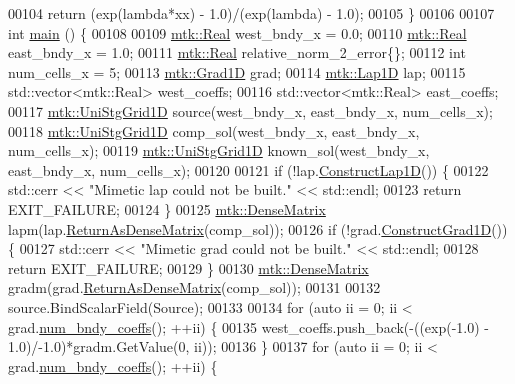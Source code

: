 \begin{DoxyCode}
00104   \textcolor{keywordflow}{return} (exp(lambda*xx) - 1.0)/(exp(lambda) - 1.0);
00105 \}
00106 
00107 \textcolor{keywordtype}{int} \hyperlink{minimalistic__poisson__1d_8cc_ae66f6b31b5ad750f1fe042a706a4e3d4}{main} () \{
00108 
00109   \hyperlink{group__c01-roots_gac080bbbf5cbb5502c9f00405f894857d}{mtk::Real} west\_bndy\_x = 0.0;
00110   \hyperlink{group__c01-roots_gac080bbbf5cbb5502c9f00405f894857d}{mtk::Real} east\_bndy\_x = 1.0;
00111   \hyperlink{group__c01-roots_gac080bbbf5cbb5502c9f00405f894857d}{mtk::Real} relative\_norm\_2\_error\{\};
00112   \textcolor{keywordtype}{int} num\_cells\_x = 5;
00113   \hyperlink{classmtk_1_1Grad1D}{mtk::Grad1D} grad;
00114   \hyperlink{classmtk_1_1Lap1D}{mtk::Lap1D} lap;
00115   std::vector<mtk::Real> west\_coeffs;
00116   std::vector<mtk::Real> east\_coeffs;
00117   \hyperlink{classmtk_1_1UniStgGrid1D}{mtk::UniStgGrid1D} source(west\_bndy\_x, east\_bndy\_x, num\_cells\_x);
00118   \hyperlink{classmtk_1_1UniStgGrid1D}{mtk::UniStgGrid1D} comp\_sol(west\_bndy\_x, east\_bndy\_x, num\_cells\_x);
00119   \hyperlink{classmtk_1_1UniStgGrid1D}{mtk::UniStgGrid1D} known\_sol(west\_bndy\_x, east\_bndy\_x, num\_cells\_x);
00120 
00121   \textcolor{keywordflow}{if} (!lap.\hyperlink{classmtk_1_1Lap1D_a685dcba88c08cf5b7b6c2aa4669a472c}{ConstructLap1D}()) \{
00122     std::cerr << \textcolor{stringliteral}{"Mimetic lap could not be built."} << std::endl;
00123     \textcolor{keywordflow}{return} EXIT\_FAILURE;
00124   \}
00125   \hyperlink{classmtk_1_1DenseMatrix}{mtk::DenseMatrix} lapm(lap.\hyperlink{classmtk_1_1Lap1D_a28672c735fa0d13e6204795b63aec4e2}{ReturnAsDenseMatrix}(comp\_sol));
00126   \textcolor{keywordflow}{if} (!grad.\hyperlink{classmtk_1_1Grad1D_a74ef5245cfae6fd158bd7f563a0c2e52}{ConstructGrad1D}()) \{
00127     std::cerr << \textcolor{stringliteral}{"Mimetic grad could not be built."} << std::endl;
00128     \textcolor{keywordflow}{return} EXIT\_FAILURE;
00129   \}
00130   \hyperlink{classmtk_1_1DenseMatrix}{mtk::DenseMatrix} gradm(grad.\hyperlink{classmtk_1_1Grad1D_a4218516bfb43f683559322ea97058c78}{ReturnAsDenseMatrix}(comp\_sol));
00131 
00132   source.BindScalarField(Source);
00133 
00134   \textcolor{keywordflow}{for} (\textcolor{keyword}{auto} ii = 0; ii < grad.\hyperlink{classmtk_1_1Grad1D_a7168205c21ba00012558f8bba069c119}{num\_bndy\_coeffs}(); ++ii) \{
00135     west\_coeffs.push\_back(-((exp(-1.0) - 1.0)/-1.0)*gradm.GetValue(0, ii));
00136   \}
00137   \textcolor{keywordflow}{for} (\textcolor{keyword}{auto} ii = 0; ii < grad.\hyperlink{classmtk_1_1Grad1D_a7168205c21ba00012558f8bba069c119}{num\_bndy\_coeffs}(); ++ii) \{

\end{DoxyCode}
